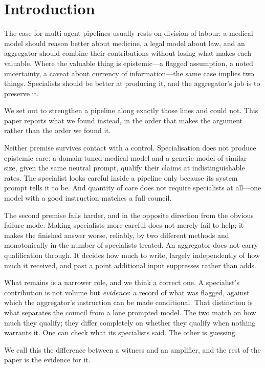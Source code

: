 \documentclass[11pt]{article}
\begin{document}
\section{Introduction}
The case for multi-agent pipelines usually rests on division of labour: a
medical model should reason better about medicine, a legal model about law,
and an aggregator should combine their contributions without losing what makes
each valuable. Where the valuable thing is epistemic---a flagged assumption, a
noted uncertainty, a caveat about currency of information---the same case
implies two things. Specialists should be better at producing it, and the
aggregator's job is to preserve it.

We set out to strengthen a pipeline along exactly those lines and could not.
This paper reports what we found instead, in the order that makes the argument
rather than the order we found it.

Neither premise survives contact with a control. Specialisation does not
produce epistemic care: a domain-tuned medical model and a generic model of
similar size, given the same neutral prompt, qualify their claims at
indistinguishable rates. The specialist looks careful inside a pipeline only
because its system prompt tells it to be. And quantity of care does not require
specialists at all---one model with a good instruction matches a full council.

The second premise fails harder, and in the opposite direction from the
obvious failure mode. Making specialists more careful does not merely fail to
help; it makes the finished answer worse, reliably, by two different methods
and monotonically in the number of specialists treated. An aggregator does not
carry qualification through. It decides how much to write, largely
independently of how much it received, and past a point additional input
suppresses rather than adds.

What remains is a narrower role, and we think a correct one. A specialist's
contribution is not volume but \emph{evidence}: a record of what was flagged,
against which the aggregator's instruction can be made conditional. That
distinction is what separates the council from a lone prompted model. The two
match on how much they qualify; they differ completely on whether they qualify
when nothing warrants it. One can check what its specialists said. The other
is guessing.

We call this the difference between a witness and an amplifier, and the rest
of the paper is the evidence for it.
\end{document}
